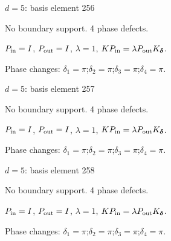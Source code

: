 \vfill
{\footnotesize\texttt{}}
\newpage
{}
{\Large $d=5$: basis element 256}\par
No boundary support. 4 phase defects.
\begin{center}
\end{center}
\vspace{-1mm}
$P_{\rm in}=I$, \quad $P_{\rm out}=I$, \quad $\lambda=1$, \qquad $K P_{\rm in}=\lambda P_{\rm out}K_{\boldsymbol\delta}$.
\par\smallskip\begin{minipage}{.98\linewidth}\small Phase changes: $\delta_{1}=\pi$;\quad $\delta_{2}=\pi$;\quad $\delta_{3}=\pi$;\quad $\delta_{4}=\pi$.\end{minipage}
\vfill
{\footnotesize\texttt{}}
\newpage
{}
{\Large $d=5$: basis element 257}\par
No boundary support. 4 phase defects.
\begin{center}
\end{center}
\vspace{-1mm}
$P_{\rm in}=I$, \quad $P_{\rm out}=I$, \quad $\lambda=1$, \qquad $K P_{\rm in}=\lambda P_{\rm out}K_{\boldsymbol\delta}$.
\par\smallskip\begin{minipage}{.98\linewidth}\small Phase changes: $\delta_{1}=\pi$;\quad $\delta_{2}=\pi$;\quad $\delta_{3}=\pi$;\quad $\delta_{4}=\pi$.\end{minipage}
\vfill
{\footnotesize\texttt{}}
\newpage
{}
{\Large $d=5$: basis element 258}\par
No boundary support. 4 phase defects.
\begin{center}
\end{center}
\vspace{-1mm}
$P_{\rm in}=I$, \quad $P_{\rm out}=I$, \quad $\lambda=1$, \qquad $K P_{\rm in}=\lambda P_{\rm out}K_{\boldsymbol\delta}$.
\par\smallskip\begin{minipage}{.98\linewidth}\small Phase changes: $\delta_{1}=\pi$;\quad $\delta_{2}=\pi$;\quad $\delta_{3}=\pi$;\quad $\delta_{4}=\pi$.\end{minipage}
\vfill
{\footnotesize\texttt{}}
